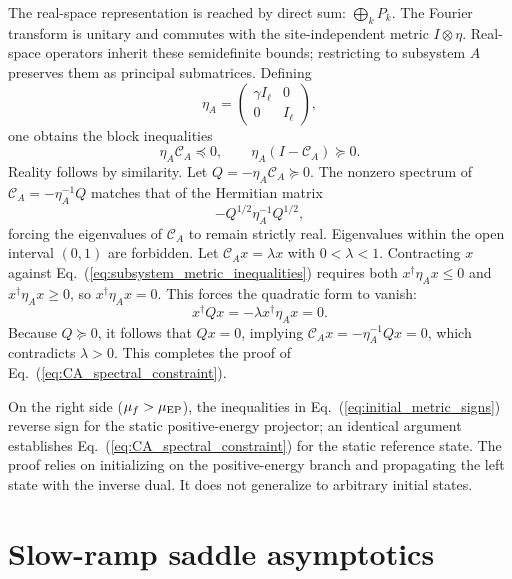 \documentclass[aps,prb,reprint,superscriptaddress,amsmath,amssymb,floatfix]{revtex4-2}
\begin{document}
The real-space representation is reached by direct sum: $\bigoplus_k P_k$. The Fourier transform is unitary and commutes with the site-independent metric $I\otimes\eta$. Real-space operators inherit these semidefinite bounds; restricting to subsystem $A$ preserves them as principal submatrices. Defining
\begin{equation}
\eta_A=
\begin{pmatrix}
\gamma I_\ell&0\\
0&I_\ell
\end{pmatrix},
\end{equation}
one obtains the block inequalities
\begin{equation}
\eta_A\mathcal C_A\preceq0,
\qquad
\eta_A(I-\mathcal C_A)\succeq0 .
\label{eq:subsystem_metric_inequalities}
\end{equation}
%
Reality follows by similarity. Let $Q=-\eta_A\mathcal C_A\succeq0$. The nonzero spectrum of $\mathcal C_A=-\eta_A^{-1}Q$ matches that of the Hermitian matrix
\begin{equation}
-Q^{1/2}\eta_A^{-1}Q^{1/2},
\end{equation}
forcing the eigenvalues of $\mathcal C_A$ to remain strictly real.
%
  Eigenvalues within the open interval $(0,1)$ are forbidden. Let $\mathcal C_Ax=\lambda x$ with $0<\lambda<1$. Contracting $x$ against Eq.~(\ref{eq:subsystem_metric_inequalities}) requires both $x^\dagger\eta_Ax\le0$ and $x^\dagger\eta_Ax\ge0$, so $x^\dagger\eta_Ax=0$. This forces the quadratic form to vanish:
\begin{equation}
x^\dagger Qx
=
-\lambda x^\dagger\eta_Ax
=
0 .
\end{equation}
Because $Q\succeq0$, it follows that $Qx=0$, implying $\mathcal C_Ax=-\eta_A^{-1}Qx=0$, which contradicts $\lambda>0$. This completes the proof of Eq.~(\ref{eq:CA_spectral_constraint}).

On the right side ($\mu_f>\mu_{\rm EP}$), the inequalities in Eq.~(\ref{eq:initial_metric_signs}) reverse sign for the static positive-energy projector; an identical argument establishes Eq.~(\ref{eq:CA_spectral_constraint}) for the static reference state. The proof relies on initializing on the positive-energy branch and propagating the left state with the inverse dual. It does not generalize to arbitrary initial states.

\section{Slow-ramp saddle asymptotics}
\label{app:slow_ramp_asymptotics}
\end{document}
